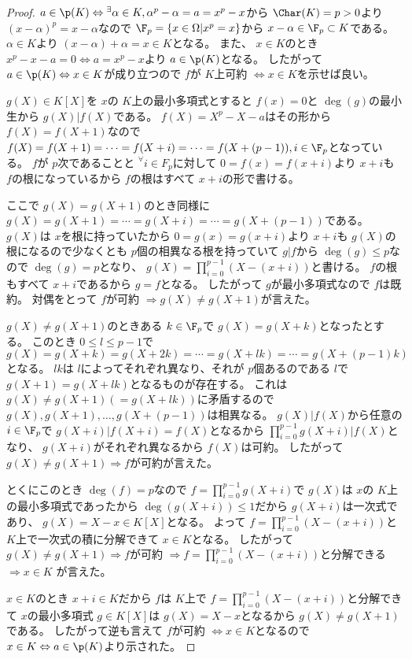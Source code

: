 \documentclass[../master_galois_theory]{subfiles}
\begin{document}
\begin{proof}
  $a \in \p(K) \Leftrightarrow {}^\exists \alpha \in K , \alpha^p - \alpha = a = x^p - x$から $\Char(K) = p > 0$より
  $(x - \alpha)^p = x - \alpha$なので $\F_p = \{ x \in \Omega | x^p = x \}$から $x - \alpha \in \F_p \subset K$である。
  $\alpha \in K$より $(x - \alpha) + \alpha = x \in K$となる。
  また、 $x \in K$のとき $x^p - x - a = 0 \Leftrightarrow a = x^p - x$より
  $a \in \p(K)$となる。
  したがって $a \in \p(K) \Leftrightarrow x \in K$が成り立つので
  $f$が $K$上可約 $\Leftrightarrow x \in K$を示せば良い。

  $g(X) \in K[X]$を $x$の $K$上の最小多項式とすると $f(x) = 0$と $\deg(g)$の最小生から $g(X) | f(X)$である。
  $f(X) = X^p - X - a$はその形から $f(X) = f(X+1)$なので
  $f(X) = f(X+1) = \cdots = f(X+i) = \cdots = f(X+(p-1)) , i \in \F_p$となっている。
  $f$が $p$次であることと ${}^\forall i \in F_p$に対して
  $0 = f(x) = f(x+i)$より $x + i$も $f$の根になっているから
  $f$の根はすべて $x + i$の形で書ける。

  ここで $g(X) = g(X+1)$のとき同様に $g(X) = g(X+1) = \cdots = g(X+i) = \cdots = g(X+(p-1))$である。
  $g(X)$は $x$を根に持っていたから $0 = g(x) = g(x+i)$より
  $x + i$も $g(X)$の根になるので少なくとも $p$個の相異なる根を持っていて
  $g|f$から $\deg(g) \leq p$なので $\deg(g) = p$となり、
  $g(X) = \prod_{i=0}^{p-1}(X - (x + i))$と書ける。
  $f$の根もすべて $x + i$であるから $g = f$となる。
  したがって $g$が最小多項式なので $f$は既約。
  対偶をとって $f$が可約 $\Rightarrow g(X) \neq g(X+1)$が言えた。

  $g(X) \neq g(X+1)$のときある $k \in \F_p$で $g(X) = g(X+k)$となったとする。
  このとき $0 \leq l \leq p-1$で $g(X) = g(X+k) = g(X+2k) = \cdots = g(X+lk) = \cdots = g(X+(p-1)k)$となる。
  $lk$は $l$によってそれぞれ異なり、それが $p$個あるのである $l$で
  $g(X+1) = g(X+lk)$となるものが存在する。
  これは $g(X) \neq g(X+1) (= g(X+lk))$に矛盾するので
  $g(X) , g(X+1) , \dots , g(X+(p-1))$は相異なる。
  $g(X)|f(X)$から任意の $i \in \F_p$で $g(X+i)|f(X+i) = f(X)$となるから
  $\prod_{i=0}^{p-1}g(X+i)|f(X)$となり、 $g(X+i)$がそれぞれ異なるから
  $f(X)$は可約。
  したがって $g(X) \neq g(X+1) \Rightarrow f$が可約が言えた。

  とくにこのとき $\deg(f) = p$なので $f = \prod_{i=0}^{p-1}g(X+i)$で
  $g(X)$は $x$の $K$上の最小多項式であったから
  $\deg(g(X+i)) \leq 1$だから $g(X+i)$は一次式であり、
  $g(X) = X - x \in K[X]$となる。
  よって $f = \prod_{i=0}^{p-1}(X - (x + i))$と $K$上で一次式の積に分解できて
  $x \in K$となる。
  したがって $g(X) \neq g(X+1) \Rightarrow f$が可約 $\Rightarrow f = \prod_{i=0}^{p-1}(X - (x + i))$と分解できる $\Rightarrow x \in K$
  が言えた。

  $x \in K$のとき $x + i \in K$だから $f$は $K$上で $f = \prod_{i=0}^{p-1}(X - (x + i))$と分解できて $x$の最小多項式 $g \in K[X]$は
  $g(X) = X - x$となるから $g(X) \neq g(X+1)$である。
  したがって逆も言えて
  $f$が可約 $\Leftrightarrow x \in K$となるので $x \in K \Leftrightarrow a \in \p(K)$より示された。
\end{proof}
\end{document}
